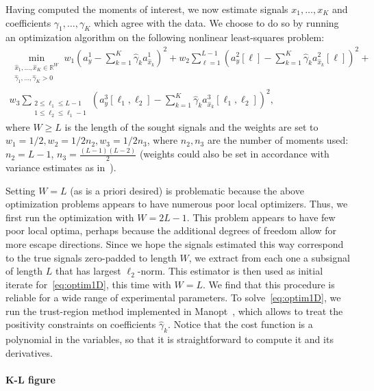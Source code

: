 \documentclass[12pt]{article}
\newcommand{\1}{\mathbf{1}}
\newcommand{\R}{\mathbb{R}}
\theoremstyle{plain}
\theoremstyle{definition}
\theoremstyle{remark}
\theoremstyle{plain}
\theoremstyle{remark}
\theoremstyle{plain}
\theoremstyle{plain}
\theoremstyle{plain}
\numberwithin{equation}{section}
\begin{document}
Having computed the moments of interest, we now estimate signals $x_1, \ldots, x_K$ and coefficients $\gamma_1, \ldots, \gamma_K$ which agree with the data. We choose to do so by running an optimization algorithm on the following nonlinear least-squares problem:
\begin{multline}
\min_{\substack{\hat x_1, \ldots, \hat x_K \in \R^{W} \\ \hat \gamma_1, \ldots, \hat \gamma_K > 0}} w_1 \left( a_y^1 - \sum_{k=1}^K \hat \gamma_k a_{\hat x_k}^1 \right)^2 + w_2 \sum_{\ell = 1}^{L-1} \left( a_y^2[\ell] - \sum_{k=1}^K \hat \gamma_k a_{\hat x_k}^2[\ell] \right)^2 + \\ w_3 \sum_{\substack{2\leq\ell_1\leq L-1 \\ 1 \leq \ell_2 \leq \ell_1-1}} \left( a_y^3[\ell_1, \ell_2] - \sum_{k=1}^K \hat \gamma_k a_{\hat x_k}^3[\ell_1,\ell_2] \right)^2,
\label{eq:optim1D}
\end{multline}
where $W \geq L$ is the length of the sought signals and the weights are set to $w_1 = 1/2, w_2 = 1/2n_2, w_3 = 1/2n_3$, where $n_2, n_3$ are the number of moments used: $n_2 = L-1$, $n_3 = \frac{(L-1)(L-2)}{2}$ (weights could also be set in accordance with variance estimates as in~\cite{boumal2017heterogeneous}).

Setting $W = L$ (as is a priori desired) is problematic because the above optimization problems appears to have numerous poor local optimizers.
Thus, we first run the optimization with $W = 2L-1$. This problem appears to have few poor local optima, perhaps because the additional degrees of freedom allow for more escape directions. Since we hope the signals estimated this way correspond to the true signals zero-padded to length $W$, we extract from each one a subsignal of length $L$ that has largest $\ell_2$-norm. This estimator is then used as initial iterate for~\eqref{eq:optim1D}, this time with $W = L$. We find that this procedure is reliable for a wide range of experimental parameters. To solve~\eqref{eq:optim1D}, we run the trust-region method implemented in Manopt~\cite{manopt}, which allows to treat the positivity constraints on coefficients $\hat \gamma_k$. Notice that the cost function is a polynomial in the variables, so that it is straightforward to compute it and its derivatives.


\paragraph{K-L figure}
\end{document}
